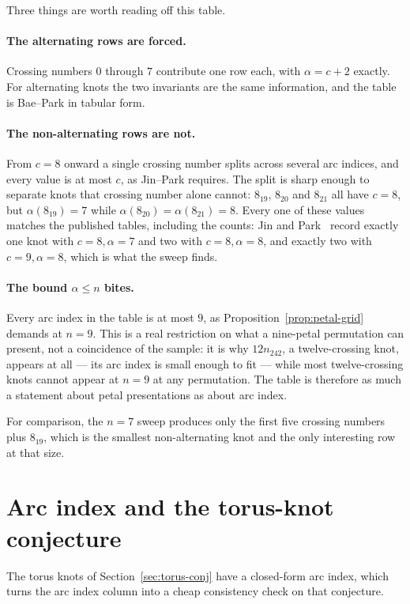 \documentclass[11pt,oneside]{report}
\theoremstyle{definition}
\begin{document}
Three things are worth reading off this table.

\paragraph{The alternating rows are forced.} Crossing numbers $0$ through
$7$ contribute one row each, with $\alpha = c + 2$ exactly. For alternating
knots the two invariants are the same information, and the table is
Bae--Park in tabular form.

\paragraph{The non-alternating rows are not.} From $c = 8$ onward a single
crossing number splits across several arc indices, and every value is at
most $c$, as Jin--Park requires. The split is sharp enough to separate
knots that crossing number alone cannot: $8_{19}$, $8_{20}$ and $8_{21}$
all have $c = 8$, but $\alpha(8_{19}) = 7$ while
$\alpha(8_{20}) = \alpha(8_{21}) = 8$. Every one of these values matches
the published tables, including the counts: Jin and
Park~\cite{JinPark} record exactly one knot with $c = 8, \alpha = 7$ and
two with $c = 8, \alpha = 8$, and exactly two with $c = 9, \alpha = 8$,
which is what the sweep finds.

\paragraph{The bound $\alpha \leq n$ bites.} Every arc index in the table
is at most $9$, as Proposition~\ref{prop:petal-grid} demands at $n = 9$.
This is a real restriction on what a nine-petal permutation can present,
not a coincidence of the sample: it is why $12n_{242}$, a twelve-crossing
knot, appears at all --- its arc index is small enough to fit --- while
most twelve-crossing knots cannot appear at $n = 9$ at any permutation. The
table is therefore as much a statement about petal presentations as about
arc index.

For comparison, the $n = 7$ sweep produces only the first five crossing
numbers plus $8_{19}$, which is the smallest non-alternating knot and the
only interesting row at that size.

\section{Arc index and the torus-knot conjecture}

The torus knots of Section~\ref{sec:torus-conj} have a closed-form arc
index, which turns the arc index column into a cheap consistency check on
that conjecture.
\end{document}
